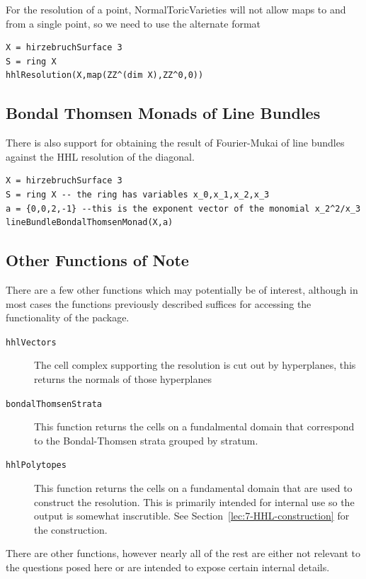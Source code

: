 \documentclass{amsart}
\begin{document}
For the resolution of a point, NormalToricVarieties will not allow maps to and from a single point, so we need to use the alternate format

\begin{verbatim}
X = hirzebruchSurface 3
S = ring X
hhlResolution(X,map(ZZ^(dim X),ZZ^0,0))
\end{verbatim}

\subsection{Bondal Thomsen Monads of Line Bundles}

There is also support for obtaining the result of Fourier-Mukai of line bundles against the HHL resolution of the diagonal.
\begin{verbatim}
X = hirzebruchSurface 3
S = ring X -- the ring has variables x_0,x_1,x_2,x_3
a = {0,0,2,-1} --this is the exponent vector of the monomial x_2^2/x_3
lineBundleBondalThomsenMonad(X,a)
\end{verbatim}



\subsection{Other Functions of Note}

There are a few other functions which may potentially be of interest, although in most cases the functions previously described suffices for accessing the functionality of the package.
\begin{description}
\item[\texttt{hhlVectors}] The cell complex supporting the resolution is cut out by hyperplanes, this returns the normals of those hyperplanes
\item[\texttt{bondalThomsenStrata}] This function returns the cells on a fundalmental domain that correspond to the Bondal-Thomsen strata grouped by stratum.
\item[\texttt{hhlPolytopes}] This function returns the cells on a fundamental domain that are used to construct the resolution. This is primarily intended for internal use so the output is somewhat inscrutible. See Section~\ref{lec:7-HHL-construction} for the construction.
\end{description}

There are other functions, however nearly all of the rest are either not relevant to the questions posed here or are intended to expose certain internal details.


\ifdefined\whole
\else


\end{document}
